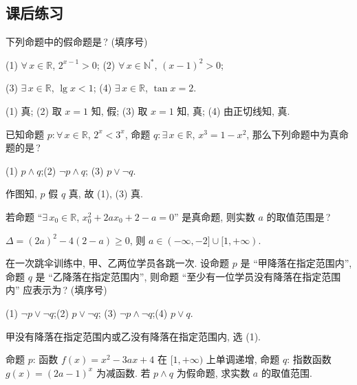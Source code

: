   \subsection{课后练习}
  \begin{exercise}
    下列命题中的假命题是\,? (填序号)
    
    (1) $\forall\, x\in \mathbb{R}$, $2^{x-1}>0$;\qquad
    (2) $\forall\, x\in \mathbb{N}^*$, $(x-1)^2>0$;
    
    (3) $\exists\, x\in \mathbb{R}$, $\lg x<1$;\qquad 
    (4) $\exists\, x\in \mathbb{R}$, $\tan x=2$.
  \end{exercise}

  \beginsolution
    (1) 真; (2) 取 $x=1$ 知, 假; (3) 取 $x=1$ 知, 真; (4) 由正切线知, 真.
  \endsolution
  
  \begin{exercise}
    已知命题 $p\colon \forall\, x\in \mathbb{R}$, $2^x<3^x$,
    命题 $q\colon \exists\, x\in \mathbb{R}$, $x^3 =1-x^2$,
    那么下列命题中为真命题的是\,?
    
    (1) $p\wedge q$;\qquad (2) $\neg p\wedge q$;\qquad
    (3) $p\vee \neg q$.
  \end{exercise}

  \beginsolution
    作图知, $p$ 假 $q$ 真, 故 (1), (3) 真.
  \endsolution
  
  \begin{exercise}
    若命题 ``$\exists\, x_0\in \mathbb{R}$, $x_0^2+ 2ax_0+2-a=0$'' 是真命题,
    则实数 $a$ 的取值范围是\,?
  \end{exercise}

  \beginsolution
    $\Delta= (2a)^2-4(2-a)\geqslant 0$, 则 $a\in(-\infty,-2]\cup[1,+\infty)$.
  \endsolution
  
  \begin{exercise}
    在一次跳伞训练中, 甲、乙两位学员各跳一次. 设命题 $p$ 是 ``甲降落在指定范围内'',
    命题 $q$ 是 ``乙降落在指定范围内'', 则命题 ``至少有一位学员没有降落在指定范围内'' 
    应表示为\,? (填序号)
    
    (1) $\neg p\vee \neg q$;\qquad (2) $p\vee \neg q$;\qquad
    (3) $\neg p\wedge \neg q$;\qquad (4) $p\vee q$.
  \end{exercise}

  \beginsolution
    甲没有降落在指定范围内或乙没有降落在指定范围内, 选 (1).
  \endsolution
  
  \begin{exercise}
    命题 $p$: 函数 $f(x)=x^2 -3ax+4$ 在 $[1,+\infty)$ 上单调递增,
    命题 $q$: 指数函数 $g(x)=(2a-1)^x$ 为减函数. 若 $p\wedge q$ 为假命题,
    求实数 $a$ 的取值范围.
  \end{exercise}

